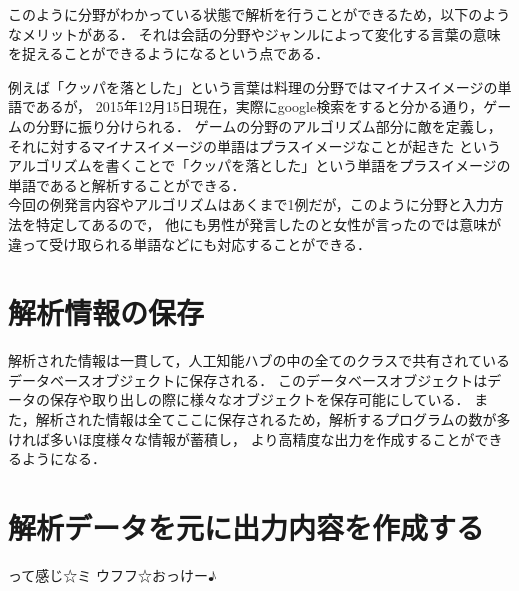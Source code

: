 このように分野がわかっている状態で解析を行うことができるため，以下のようなメリットがある．
それは会話の分野やジャンルによって変化する言葉の意味を捉えることができるようになるという点である．

例えば「クッパを落とした」という言葉は料理の分野ではマイナスイメージの単語であるが，
2015年12月15日現在，実際にgoogle検索をすると分かる通り，ゲームの分野に振り分けられる．
ゲームの分野のアルゴリズム部分に敵を定義し，それに対するマイナスイメージの単語はプラスイメージなことが起きた
というアルゴリズムを書くことで「クッパを落とした」という単語をプラスイメージの単語であると解析することができる．
\\
今回の例発言内容やアルゴリズムはあくまで1例だが，このように分野と入力方法を特定してあるので，
他にも男性が発言したのと女性が言ったのでは意味が違って受け取られる単語などにも対応することができる．

\section{解析情報の保存}
解析された情報は一貫して，人工知能ハブの中の全てのクラスで共有されているデータベースオブジェクトに保存される．
このデータベースオブジェクトはデータの保存や取り出しの際に様々なオブジェクトを保存可能にしている．
また，解析された情報は全てここに保存されるため，解析するプログラムの数が多ければ多いほ度様々な情報が蓄積し，
より高精度な出力を作成することができるようになる．



\section{解析データを元に出力内容を作成する}

って感じ☆ミ ウフフ☆おっけー♪

